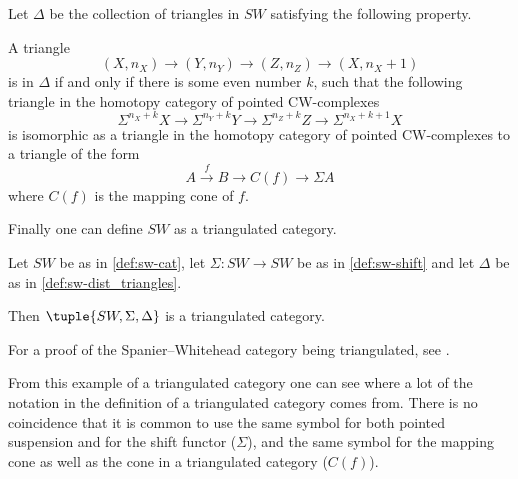 \begin{definition}
    \label{def:sw-dist_triangles}
    Let \( \Delta \) be the collection of triangles in \( SW \) satisfying the following property.

    A triangle
    \[
        (X, n_X) \to (Y, n_Y) \to (Z, n_Z) \to (X, n_X + 1)
    \]
    is in \( \Delta \) if and only if there is some even number \( k \), such that the following triangle in the homotopy category of pointed CW-complexes
    \[
        \Sigma^{n_X + k} X \to \Sigma^{n_Y + k} Y \to \Sigma^{n_Z + k} Z \to \Sigma^{n_X + k + 1} X
    \]
    is isomorphic as a triangle in the homotopy category of pointed CW-complexes to a triangle of the form
    \[
        A \stackrel{f}{\to} B \to C(f) \to \Sigma A
    \]
    where \( C(f) \) is the mapping cone of \( f \).
\end{definition}

Finally one can define \( SW \) as a triangulated category.

\begin{example}
    Let \( SW \) be as in \autoref{def:sw-cat}, let \( \Sigma: SW \to SW \) be as in \autoref{def:sw-shift} and let \( \Delta \) be as in \autoref{def:sw-dist_triangles}.

    Then \( \tuple{SW, \Sigma, \Delta} \) is a triangulated category.
\end{example}

For a proof of the Spanier--Whitehead category being triangulated, see \cite[Theorem 5.9]{Daria_Bachelor}.

From this example of a triangulated category one can see where a lot of the notation in the definition of a triangulated category comes from. There is no coincidence that it is common to use the same symbol for both pointed suspension and for the shift functor (\( \Sigma \)), and the same symbol for the mapping cone as well as the cone in a triangulated category (\( C(f) \)).
